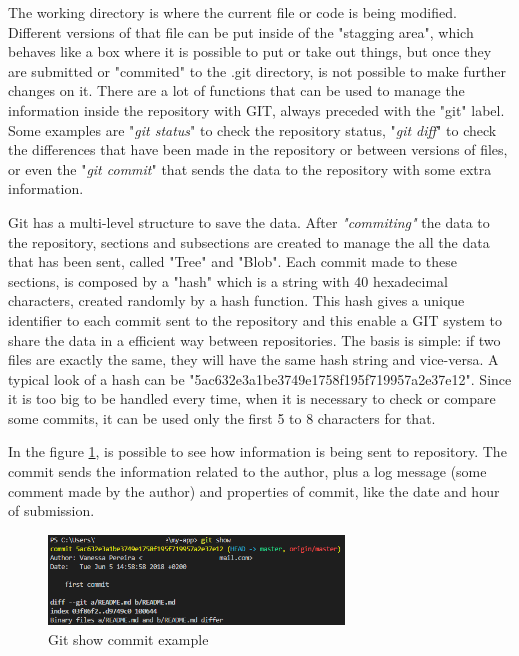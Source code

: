 \documentclass[mim_thesis.tex]{subfiles}
\begin{document}
The working directory is where the current file or code is being modified. Different versions of that file can be put inside of the "stagging area", which behaves like a box where it is possible to put or take out things, but once they are submitted or "commited" to the .git directory, is not possible to make further changes on it. There are a lot of functions that can be used to manage the information inside the repository with GIT, always preceded with the "git" label. Some examples are "\textit{git status}" to check the repository status, "\textit{git diff}" to check the differences that have been made in the repository or between versions of files, or even the "\textit{git commit}" that sends the data to the repository with some extra information.

Git has a multi-level structure to save the data. After \textit{"commiting"} the data to the repository, sections and subsections are created to manage the all the data that has been sent, called "Tree" and "Blob". Each commit made to these sections, is composed by a "hash" which is a string with 40 hexadecimal characters, created randomly by a hash function. This hash gives a unique identifier to each commit sent to the repository and this enable a GIT system to share the data in a efficient way between repositories. The basis is simple: if two files are exactly the same, they will have the same hash string and vice-versa. A typical look of a hash can be "5ac632e3a1be3749e1758f195f719957a2e37e12". Since it is too big to be handled every time, when it is necessary to check or compare some commits, it can be used only the first 5 to 8 characters for that.

In the figure \ref{fig:commit_example}, is possible to see how information is being sent to repository. The commit sends the information related to the author, plus a log message (some comment made by the author) and properties of commit, like the date and hour of submission. 

\begin{figure}[H]
	\centering
    \includegraphics[width=0.7\textwidth]{img/commit_example.PNG}
	\caption{Git show commit example}
	\label{fig:commit_example}
\end{figure}
\end{document}
